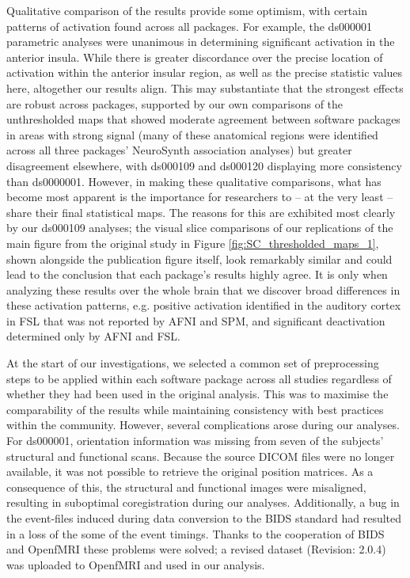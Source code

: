 Qualitative comparison of the results provide some optimism, with certain patterns of activation found across all packages. For example, the ds000001 parametric analyses were unanimous in determining significant activation in the anterior insula. While there is greater discordance over the precise location of activation within the anterior insular region, as well as the precise statistic values here, altogether our results align. This may substantiate that the strongest effects are robust across packages, supported by our own comparisons of the unthresholded maps that showed moderate agreement between software packages in areas with strong signal  (many of these anatomical regions were identified across all three packages' NeuroSynth association analyses) but greater disagreement elsewhere, with ds000109 and ds000120 displaying more consistency than ds0000001. However, in making these qualitative comparisons, what has become most apparent is the importance for researchers to -- at the very least -- share their final statistical maps. The reasons for this are exhibited most clearly by our ds000109 analyses; the visual slice comparisons of our replications of the main figure from the original study in Figure \ref{fig:SC_thresholded_maps_1}, shown alongside the publication figure itself, look remarkably similar and could lead to the conclusion that each package's results highly agree. It is only when analyzing these results over the whole brain that we discover broad differences in these activation patterns, e.g. positive activation identified in the auditory cortex in FSL that was not reported by AFNI and SPM, and significant deactivation determined only by AFNI and FSL.

At the start of our investigations, we selected a common set of preprocessing steps to be applied within each software package across all studies regardless of whether they had been used in the original analysis. This was to maximise the comparability of the results while maintaining consistency with best practices within the community. However, several complications arose during our analyses. For ds000001, orientation information was missing from seven of the subjects' structural and functional scans. Because the source DICOM files were no longer available, it was not possible to retrieve the original position matrices. As a consequence of this, the structural and functional images were misaligned, resulting in suboptimal coregistration during our analyses. Additionally, a bug in the event-files induced during data conversion to the BIDS standard had resulted in a loss of the some of the event timings. Thanks to the cooperation of BIDS and OpenfMRI these problems were solved; a revised dataset (Revision: 2.0.4) was uploaded to OpenfMRI and used in our analysis. 

